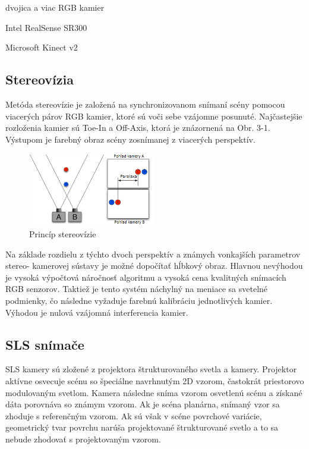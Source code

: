 \begin{description}[leftmargin=*,labelsep=5.8mm, font=$\bullet$~\normalfont\scshape\color{black!20!black}]
\item [stereo-vízie] dvojica a viac RGB kamier 
\item [snímania štrukturovaným svetlom (SLS)] Intel RealSense SR300 
\item [merania času doby letu (TOF)] Microsoft Kinect v2 
\end{description}


\subsection{Stereovízia}

Metóda stereovízie je založená na synchronizovanom snímaní scény pomocou viacerých párov
RGB kamier, ktoré sú voči sebe vzájomne posunuté. Najčastejšie rozloženia kamier sú Toe-In a Off-Axis, ktorá je znázornená na Obr. 3-1. Výstupom je farebný obraz scény zosnímanej z viacerých perspektív.

\begin{figure}[h]

	\centering

	\includegraphics[width=0.5\textwidth]{figures/stereovizia.png} 

	\caption{Princíp stereovízie}
	\label{fig:stereovizia}

\end{figure}

Na základe rozdielu z týchto dvoch perspektív a známych vonkajších parametrov stereo-
kamerovej sústavy je možné dopočítať hĺbkový obraz. Hlavnou nevýhodou je vysoká výpočtová náročnosť algoritmu a vysoká cena kvalitných snímacích RGB senzorov. Taktiež je tento systém náchylný na meniace sa svetelné podmienky, čo následne vyžaduje farebnú kalibráciu jednotlivých kamier. Výhodou je nulová vzájomná interferencia kamier.

\subsection{SLS snímače}
\label{sec:sls}
SLS kamery sú zložené z projektora štrukturovaného svetla a kamery. Projektor aktívne
osvecuje scénu so špeciálne navrhnutým 2D vzorom, častokrát priestorovo modulovaným svetlom. Kamera následne sníma vzorom osvetlenú scénu a získané dáta porovnáva so známym vzorom. Ak je scéna planárna, snímaný vzor sa zhoduje s referenčným vzorom. Ak sú však v scéne povrchové variácie, geometrický tvar povrchu narúša projektované štrukturované svetlo a to sa nebude zhodovať s projektovaným vzorom.

